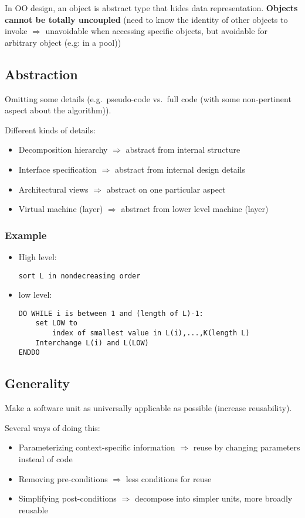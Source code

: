 In OO design, an object is abstract type that hides data representation.
\textbf{Objects cannot be totally uncoupled} (need to know the identity of other
objects to invoke $\Rightarrow$ unavoidable when accessing specific
objects, but avoidable for arbitrary object (e.g: in a pool))

\subsection{Abstraction}

Omitting some details (e.g.\ pseudo-code vs.\ full code (with some non-pertinent aspect about the algorithm)). 

Different kinds of details:
\begin{itemize}
\item Decomposition hierarchy $\Rightarrow$ abstract from internal structure
\item Interface specification $\Rightarrow$ abstract from internal design details
\item Architectural views $\Rightarrow$ abstract on one particular aspect
\item Virtual machine (layer) $\Rightarrow$ abstract from lower level machine (layer)
\end{itemize}

\subsubsection{Example}
\begin{itemize}
    \item High level:

\begin{lstlisting}
sort L in nondecreasing order
\end{lstlisting}

    \item low level:

\begin{lstlisting}
DO WHILE i is between 1 and (length of L)-1:
    set LOW to
        index of smallest value in L(i),...,K(length L)
    Interchange L(i) and L(LOW)
ENDDO
\end{lstlisting}
\end{itemize}

\subsection{Generality}

Make a software unit as universally applicable as possible (increase
reusability).

Several ways of doing this:

\begin{itemize}
\item Parameterizing context-specific information $\Rightarrow$ reuse by changing parameters
instead of code
\item Removing pre-conditions $\Rightarrow$ less conditions for reuse
\item Simplifying post-conditions $\Rightarrow$ decompose into simpler units, more broadly reusable
\end{itemize}
